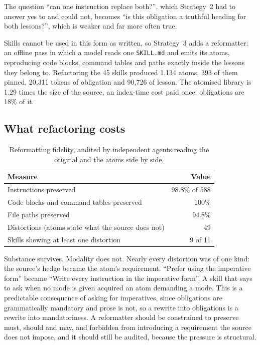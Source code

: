 \documentclass[11pt]{article}
\begin{document}
The question ``can one instruction replace both?'', which Strategy~2 had to answer yes to and could
not, becomes ``is this obligation a truthful heading for both lessons?'', which is weaker and far more
often true.

Skills cannot be used in this form as written, so Strategy~3 adds a reformatter: an offline pass in
which a model reads one \texttt{SKILL.md} and emits its atoms, reproducing code blocks, command
tables and paths exactly inside the lessons they belong to. Refactoring the 45 skills produced 1,134
atoms, 393 of them pinned, 20,311 tokens of obligation and 90,726 of lesson. The atomised library is
1.29 times the size of the source, an index-time cost paid once; obligations are 18\% of it.

\subsection{What refactoring costs}

\begin{table}[h]\centering\small
\begin{tabular}{lr}
\toprule
Measure & Value \\
\midrule
Instructions preserved & 98.8\% of 588 \\
Code blocks and command tables preserved & 100\% \\
File paths preserved & 94.8\% \\
Distortions (atoms state what the source does not) & 49 \\
Skills showing at least one distortion & 9 of 11 \\
\bottomrule
\end{tabular}
\caption{Reformatting fidelity, audited by independent agents reading the original and the atoms
side by side.}
\label{tab:s3fid}
\end{table}

Substance survives. Modality does not. Nearly every distortion was of one kind: the source's hedge
became the atom's requirement. ``Prefer using the imperative form'' became ``Write every instruction in
the imperative form''. A skill that says to ask when no mode is given acquired an atom demanding a
mode. This is a predictable consequence of asking for imperatives, since obligations are
grammatically mandatory and prose is not, so a rewrite into obligations is a rewrite into
mandatoriness. A reformatter should be constrained to preserve must, should and may, and forbidden
from introducing a requirement the source does not impose, and it should still be audited, because
the pressure is structural.
\end{document}
